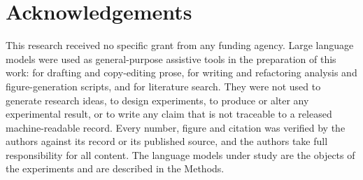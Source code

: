 \documentclass[twoside,twocolumn,9pt]{article}
\begin{document}
\section*{Acknowledgements}
This research received no specific grant from any funding agency. Large language models were used as
general-purpose assistive tools in the preparation of this work: for drafting and copy-editing prose, for
writing and refactoring analysis and figure-generation scripts, and for literature search. They were not
used to generate research ideas, to design experiments, to produce or alter any experimental result, or to
write any claim that is not traceable to a released machine-readable record. Every number, figure and
citation was verified by the authors against its record or its published source, and the authors take full
responsibility for all content. The language models under study are the objects of the experiments and are
described in the Methods.


\balance




\end{document}
